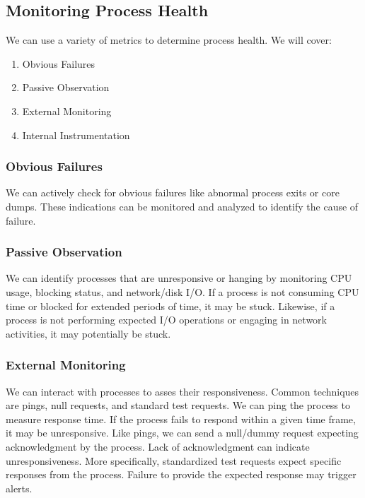 \documentclass{report}
\begin{document}
\subsection{Monitoring Process Health}
We can use a variety of metrics to determine process health. We will cover:
\begin{enumerate}[label=\textit{(\roman*)}]
\item Obvious Failures
\item Passive Observation
\item External Monitoring
\item Internal Instrumentation
\end{enumerate}


\subsubsection{Obvious Failures}
We can actively check for obvious failures like abnormal process exits or core dumps. These
indications can be monitored and analyzed to identify the cause of failure.


\subsubsection{Passive Observation}
We can identify processes that are unresponsive or hanging by monitoring CPU usage, blocking status,
and network/disk I/O. If a process is not consuming CPU time or blocked for extended periods of time, it may be
stuck. Likewise, if a process is not performing expected I/O operations or engaging in network
activities, it may potentially be stuck.


\subsubsection{External Monitoring}
We can interact with processes to asses their responsiveness. Common techniques are pings, null
requests, and standard test requests. We can ping the process to measure response time. If the
process fails to respond within a given time frame, it may be unresponsive. Like pings, we can send
a null/dummy request expecting acknowledgment by the process. Lack of acknowledgment can indicate
unresponsiveness. More specifically, standardized test requests expect specific responses from the
process. Failure to provide the expected response may trigger alerts.
\end{document}
